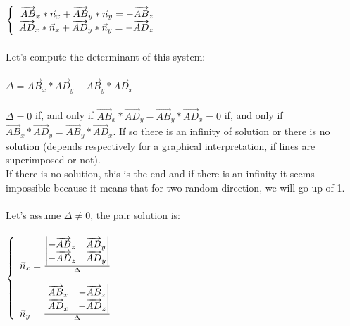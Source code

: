 \documentclass{article}
\begin{document}
			$\left\{\begin{array}{r c l}
				\overrightarrow{AB}_x * \vec{n}_x + \overrightarrow{AB}_y * \vec{n}_y = - \overrightarrow{AB}_z\\
				\overrightarrow{AD}_x * \vec{n}_x + \overrightarrow{AD}_y * \vec{n}_y = - \overrightarrow{AD}_z
			\end{array}\right.$\\\\
			
			Let's compute the determinant of this system:\\\\
			
			$\Delta = \overrightarrow{AB}_x * \overrightarrow{AD}_y - \overrightarrow{AB}_y * \overrightarrow{AD}_x$\\\\
			
			$\Delta = 0$ if, and only if $\overrightarrow{AB}_x * \overrightarrow{AD}_y - \overrightarrow{AB}_y * \overrightarrow{AD}_x = 0$ if, and only if $\overrightarrow{AB}_x * \overrightarrow{AD}_y = \overrightarrow{AB}_y * \overrightarrow{AD}_x$. If so there is an infinity of solution or there is no solution (depends respectively for a graphical interpretation, if lines are superimposed or not).\\
			If there is no solution, this is the end and if there is an infinity it seems impossible because it means that for two random direction, we will go up of 1.\\\\
			
			Let's assume $\Delta \neq 0$, the pair solution is:\\\\
			
			$\left\{\begin{array}{r c l}
				\vec{n}_x = \frac{\begin{vmatrix}
					 - \overrightarrow{AB}_z & \overrightarrow{AB}_y \\
					 - \overrightarrow{AD}_z & \overrightarrow{AD}_y
				\end{vmatrix}}{\Delta}\\\\
				\vec{n}_y = \frac{\begin{vmatrix}
					 \overrightarrow{AB}_x & - \overrightarrow{AB}_z \\
					 \overrightarrow{AD}_x & - \overrightarrow{AD}_z
				\end{vmatrix}}{\Delta}
			\end{array}\right.$\\\\
			
\end{document}

